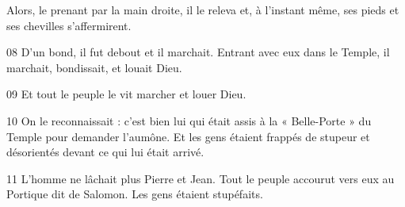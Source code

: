 Alors, le prenant par la main droite, il le releva et, à l’instant même, ses pieds et ses chevilles s’affermirent.

08 D’un bond, il fut debout et il marchait. Entrant avec eux dans le Temple, il marchait, bondissait, et louait Dieu.

09 Et tout le peuple le vit marcher et louer Dieu.

10 On le reconnaissait : c’est bien lui qui était assis à la « Belle-Porte » du Temple pour demander l’aumône. Et les gens étaient frappés de stupeur et désorientés devant ce qui lui était arrivé.

11 L’homme ne lâchait plus Pierre et Jean. Tout le peuple accourut vers eux au Portique dit de Salomon. Les gens étaient stupéfaits.